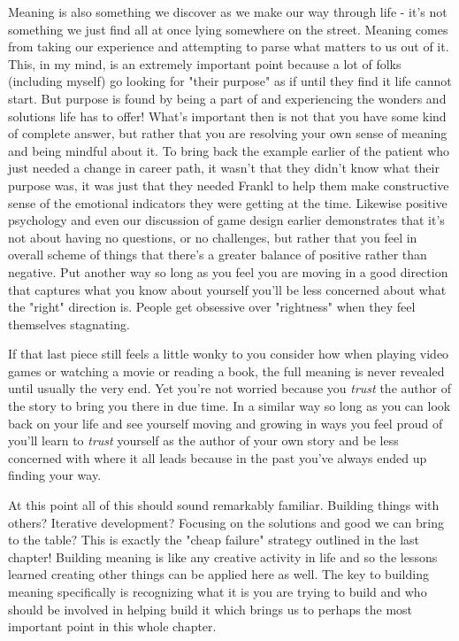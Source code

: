 \documentclass[11pt,a5paper]{book}
\begin{document}
Meaning is also something we discover as we make our way through life - it's not something we just find all at once lying somewhere on the street. Meaning comes from taking our experience and attempting to parse what matters to us out of it. This, in my mind, is an extremely important point because a lot of folks (including myself) go looking for "their purpose" as if until they find it life cannot start. But purpose is found by being a part of and experiencing the wonders and solutions life has to offer! What's important then is not that you have some kind of complete answer, but rather that you are resolving your own sense of meaning and being mindful about it. To bring back the example earlier of the patient who just needed a change in career path, it wasn't that they didn't know what their purpose was, it was just that they needed Frankl to help them make constructive sense of the emotional indicators they were getting at the time. Likewise positive psychology and even our discussion of game design earlier demonstrates that it's not about having no questions, or no challenges, but rather that you feel in overall scheme of things that there's a greater balance of positive rather than negative. Put another way so long as you feel you are moving in a good direction that captures what you know about yourself you'll be less concerned about what the "right" direction is. People get obsessive over "rightness" when they feel themselves stagnating.
\newline

If that last piece still feels a little wonky to you consider how when playing video games or watching a movie or reading a book, the full meaning is never revealed until usually the very end. Yet you're not worried because you \textit{trust} the author of the story to bring you there in due time. In a similar way so long as you can look back on your life and see yourself moving and growing in ways you feel proud of you'll learn to \textit{trust} yourself as the author of your own story and be less concerned with where it all leads because in the past you've always ended up finding your way. 
\newline

At this point all of this should sound remarkably familiar. Building things with others? Iterative development? Focusing on the solutions and good we can bring to the table? This is exactly the "cheap failure" strategy outlined in the last chapter! Building meaning is like any creative activity in life and so the lessons learned creating other things can be applied here as well. The key to building meaning specifically is recognizing what it is you are trying to build and who should be involved in helping build it which brings us to perhaps the most important point in this whole chapter.
\end{document}
